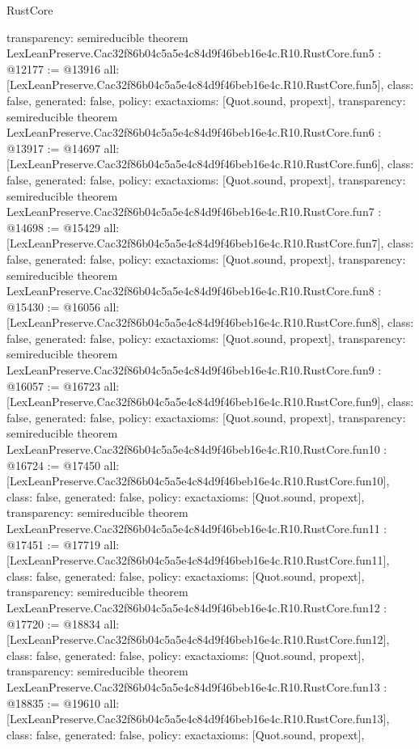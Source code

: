 \begin{lexlean}{RustCore}
\begin{coremodule}
{  transparency: semireducible
}
theorem LexLeanPreserve.Cac32f86b04c5a5e4c84d9f46beb16e4c.R10.RustCore.fun5 : @12177 := @13916 {
  all: [LexLeanPreserve.Cac32f86b04c5a5e4c84d9f46beb16e4c.R10.RustCore.fun5],
  class: false,
  generated: false,
  policy: exact{axioms: [Quot.sound, propext]},
  transparency: semireducible
}
theorem LexLeanPreserve.Cac32f86b04c5a5e4c84d9f46beb16e4c.R10.RustCore.fun6 : @13917 := @14697 {
  all: [LexLeanPreserve.Cac32f86b04c5a5e4c84d9f46beb16e4c.R10.RustCore.fun6],
  class: false,
  generated: false,
  policy: exact{axioms: [Quot.sound, propext]},
  transparency: semireducible
}
theorem LexLeanPreserve.Cac32f86b04c5a5e4c84d9f46beb16e4c.R10.RustCore.fun7 : @14698 := @15429 {
  all: [LexLeanPreserve.Cac32f86b04c5a5e4c84d9f46beb16e4c.R10.RustCore.fun7],
  class: false,
  generated: false,
  policy: exact{axioms: [Quot.sound, propext]},
  transparency: semireducible
}
theorem LexLeanPreserve.Cac32f86b04c5a5e4c84d9f46beb16e4c.R10.RustCore.fun8 : @15430 := @16056 {
  all: [LexLeanPreserve.Cac32f86b04c5a5e4c84d9f46beb16e4c.R10.RustCore.fun8],
  class: false,
  generated: false,
  policy: exact{axioms: [Quot.sound, propext]},
  transparency: semireducible
}
theorem LexLeanPreserve.Cac32f86b04c5a5e4c84d9f46beb16e4c.R10.RustCore.fun9 : @16057 := @16723 {
  all: [LexLeanPreserve.Cac32f86b04c5a5e4c84d9f46beb16e4c.R10.RustCore.fun9],
  class: false,
  generated: false,
  policy: exact{axioms: [Quot.sound, propext]},
  transparency: semireducible
}
theorem LexLeanPreserve.Cac32f86b04c5a5e4c84d9f46beb16e4c.R10.RustCore.fun10 : @16724 := @17450 {
  all: [LexLeanPreserve.Cac32f86b04c5a5e4c84d9f46beb16e4c.R10.RustCore.fun10],
  class: false,
  generated: false,
  policy: exact{axioms: [Quot.sound, propext]},
  transparency: semireducible
}
theorem LexLeanPreserve.Cac32f86b04c5a5e4c84d9f46beb16e4c.R10.RustCore.fun11 : @17451 := @17719 {
  all: [LexLeanPreserve.Cac32f86b04c5a5e4c84d9f46beb16e4c.R10.RustCore.fun11],
  class: false,
  generated: false,
  policy: exact{axioms: [Quot.sound, propext]},
  transparency: semireducible
}
theorem LexLeanPreserve.Cac32f86b04c5a5e4c84d9f46beb16e4c.R10.RustCore.fun12 : @17720 := @18834 {
  all: [LexLeanPreserve.Cac32f86b04c5a5e4c84d9f46beb16e4c.R10.RustCore.fun12],
  class: false,
  generated: false,
  policy: exact{axioms: [Quot.sound, propext]},
  transparency: semireducible
}
theorem LexLeanPreserve.Cac32f86b04c5a5e4c84d9f46beb16e4c.R10.RustCore.fun13 : @18835 := @19610 {
  all: [LexLeanPreserve.Cac32f86b04c5a5e4c84d9f46beb16e4c.R10.RustCore.fun13],
  class: false,
  generated: false,
  policy: exact{axioms: [Quot.sound, propext]},
}
\end{coremodule}
\end{lexlean}
